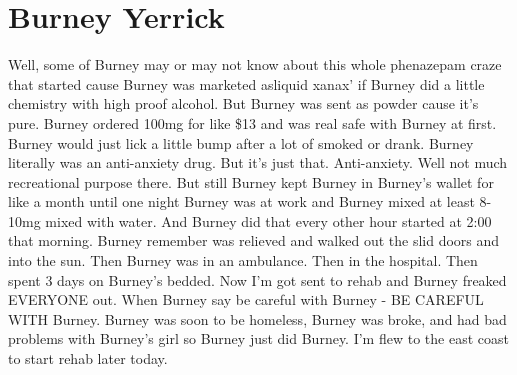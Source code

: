 \documentclass[12pt]{book}
\begin{document}
\chapter{Burney Yerrick}

Well, some of Burney may or may not know about this whole phenazepam craze that started cause Burney was marketed asliquid xanax' if Burney did a little chemistry with high proof alcohol. But Burney was sent as powder cause it's pure. Burney ordered 100mg for like \$13 and was real safe with Burney at first. Burney would just lick a little bump after a lot of smoked or drank. Burney literally was an anti-anxiety drug. But it's just that. Anti-anxiety. Well not much recreational purpose there. But still Burney kept Burney in Burney's wallet for like a month until one night Burney was at work and Burney mixed at least 8-10mg mixed with water. And Burney did that every other hour started at 2:00 that morning. Burney remember was relieved and walked out the slid doors and into the sun. Then Burney was in an ambulance. Then in the hospital. Then spent 3 days on Burney's bedded. Now I'm got sent to rehab and Burney freaked EVERYONE out. When Burney say be careful with Burney - BE CAREFUL WITH Burney. Burney was soon to be homeless, Burney was broke, and had bad problems with Burney's girl so Burney just did Burney. I'm flew to the east coast to start rehab later today.
\end{document}
